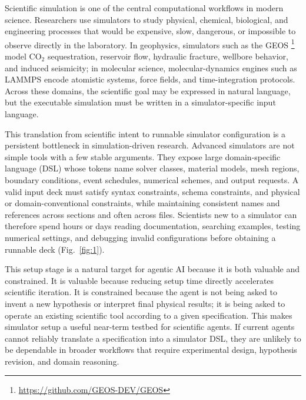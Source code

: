 \documentclass{article}
\begin{document}
Scientific simulation is one of the central computational workflows in modern science. Researchers use simulators to study physical, chemical, biological, and engineering processes that would be expensive, slow, dangerous, or impossible to observe directly in the laboratory. In geophysics, simulators such as the GEOS \footnote{\url{https://github.com/GEOS-DEV/GEOS}}~\citep{geos2024} model CO$_2$ sequestration, reservoir flow, hydraulic fracture, wellbore behavior, and induced seismicity; in molecular science, molecular-dynamics engines such as LAMMPS \citep{holbrook2026lammps} encode atomistic systems, force fields, and time-integration protocols. Across these domains, the scientific goal may be expressed in natural language, but the executable simulation must be written in a simulator-specific input language.

This translation from scientific intent to runnable simulator configuration is a persistent bottleneck in simulation-driven research. Advanced simulators are not simple tools with a few stable arguments. They expose large domain-specific language (DSL) whose tokens name solver classes, material models, mesh regions, boundary conditions, event schedules, numerical schemes, and output requests. A valid input deck must satisfy syntax constraints, schema constraints, and physical or domain-conventional constraints, while maintaining consistent names and references across sections and often across files. Scientists new to a simulator can therefore spend hours or days reading documentation, searching examples, testing numerical settings, and debugging invalid configurations before obtaining a runnable deck (Fig.~\ref{fig:1}).

This setup stage is a natural target for agentic AI because it is both valuable and constrained. It is valuable because reducing setup time directly accelerates scientific iteration. It is constrained because the agent is not being asked to invent a new hypothesis or interpret final physical results; it is being asked to operate an existing scientific tool according to a given specification. This makes simulator setup a useful near-term testbed for scientific agents. If current agents cannot reliably translate a specification into a simulator DSL, they are unlikely to be dependable in broader workflows that require experimental design, hypothesis revision, and domain reasoning.
\end{document}
